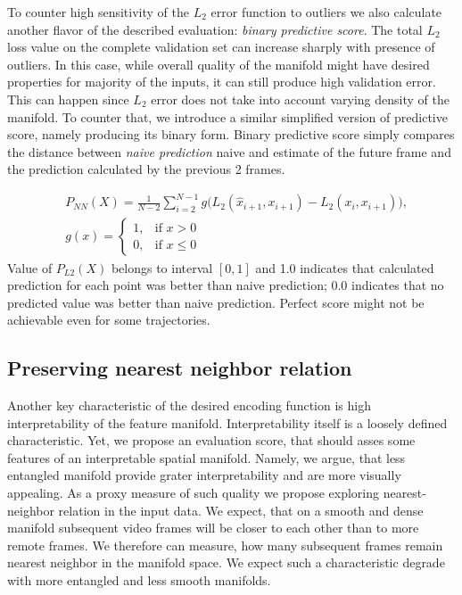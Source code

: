 To counter high sensitivity of the $L_2$ error function to outliers we also calculate another flavor of the described evaluation: \textit{binary predictive score}. The total $L_2$ loss value on the complete validation set can increase sharply with presence of outliers. In this case, while overall quality of the manifold might have desired properties for majority of the inputs, it can still produce high validation error. This can happen since $L_2$ error does not take into account varying density of the manifold. To counter that, we introduce a similar simplified version of predictive score, namely producing its binary form. Binary predictive score simply compares the distance between \textit{naive prediction} naive and estimate of the future frame and the prediction calculated by the previous 2 frames.

\begin{equation}
  \begin{aligned}
  & P_{NN}(X) = \frac{1}{N-2}\sum^{N-1}_{i=2}{g  \big( L_2(\hat{x}_{i+1}, x_{i+1})} - {L_2(x_i, x_{i+1}) \big) },\\
  & g(x) = \begin{cases} 1, & \mbox{if } x > 0 \\ 0, & \mbox{if } x \leq 0 \end{cases}
\end{aligned}
\end{equation}
 Value of $P_{L2}(X)$ belongs to interval $[0, 1]$ and 1.0 indicates that calculated prediction for each point was better than naive prediction; 0.0 indicates that no predicted value was better than naive prediction. Perfect score might not be achievable even for some trajectories.

\subsection{Preserving nearest neighbor relation}

Another key characteristic of the desired encoding function is high interpretability of the feature manifold.
Interpretability itself is a loosely defined characteristic. Yet, we propose an evaluation score, that should asses some features of an interpretable spatial manifold. Namely, we argue, that less entangled manifold provide grater interpretability and are more visually appealing. As a proxy measure of such quality we propose exploring nearest-neighbor relation in the input data. We expect, that on a smooth and dense manifold subsequent video frames will be closer to each other than to more remote frames. We therefore can measure, how many subsequent frames remain nearest neighbor in the manifold space. We expect such a characteristic degrade with more entangled and less smooth manifolds.



